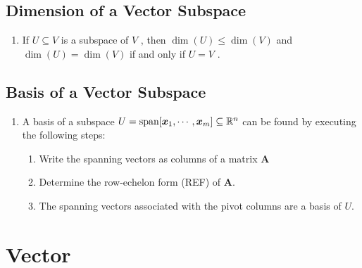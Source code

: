 \subsection{Dimension of a Vector Subspace}

\begin{enumerate}
    \item If $U \subseteq V$ is a subspace of $V$ , then $\dim(U) \leq \dim(V )$ and $\dim(U) = \dim(V )$ if and only if $U = V$ .
    \hfill \cite{mfml/book/mml/Deisenroth-Faisal-Ong}
\end{enumerate}



\subsection{Basis of a Vector Subspace}

\begin{enumerate}
    \item A basis of a subspace $U = \text{span}[\bm{x}_1, \cdots , \bm{x}_m] \subseteq \mathbb{R}^n$ can be found by executing the following steps:
    \hfill \cite{mfml/book/mml/Deisenroth-Faisal-Ong}
    \begin{enumerate}
        \item Write the spanning vectors as columns of a matrix $\bm{A}$
        \hfill \cite{mfml/book/mml/Deisenroth-Faisal-Ong}

        \item Determine the row-echelon form (REF) of $\bm{A}$.
        \hfill \cite{mfml/book/mml/Deisenroth-Faisal-Ong}

        \item The spanning vectors associated with the pivot columns are a basis of $U$.
        \hfill \cite{mfml/book/mml/Deisenroth-Faisal-Ong}
    \end{enumerate}
\end{enumerate}
























\section{Vector}

